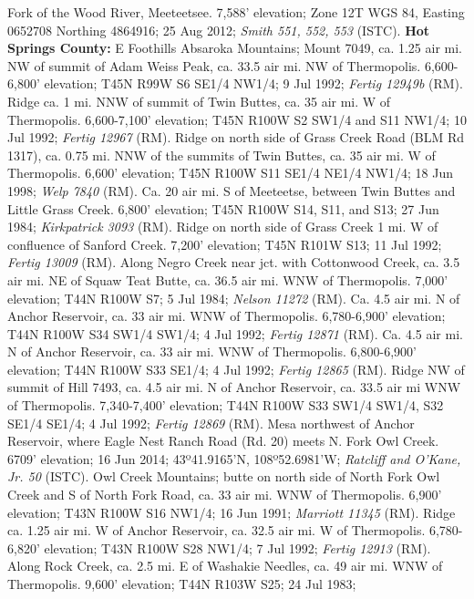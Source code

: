 Fork of the Wood River, Meeteetsee. 7,588’ elevation; Zone 12T WGS 84,
Easting 0652708 Northing 4864916; 25 Aug 2012; 
\textit{Smith 551, 552, 553} (ISTC).
  \textbf{Hot Springs County:}
E Foothills Absaroka Mountains; Mount 7049, ca. 1.25 air mi. NW of summit of
Adam Weiss Peak, ca. 33.5 air mi. NW of Thermopolis. 6,600-6,800' elevation;
T45N R99W S6 SE1/4 NW1/4; 9 Jul 1992; \textit{Fertig 12949b} (RM).
Ridge ca. 1 mi. NNW of summit of Twin Buttes, ca. 35 air mi. W of Thermopolis.
6,600-7,100' elevation; T45N R100W S2 SW1/4 and S11 NW1/4; 10 Jul 1992;
\textit{Fertig 12967} (RM).
Ridge on north side of Grass Creek Road (BLM Rd 1317), ca. 0.75 mi. NNW of the
summits of Twin Buttes, ca. 35 air mi. W of Thermopolis. 6,600' elevation;
T45N R100W S11 SE1/4 NE1/4 NW1/4; 18 Jun 1998; \textit{Welp 7840} (RM).
Ca. 20 air mi. S of Meeteetse, between Twin Buttes and Little Grass Creek.
6,800' elevation; T45N R100W S14, S11, and S13; 27 Jun 1984;
\textit{Kirkpatrick 3093} (RM).
Ridge on north side of Grass Creek 1 mi. W of confluence of Sanford Creek.
7,200' elevation; T45N R101W S13; 11 Jul 1992; \textit{Fertig 13009} (RM).
Along Negro Creek near jct. with Cottonwood Creek, ca. 3.5 air mi. NE of Squaw
Teat Butte, ca. 36.5 air mi. WNW of Thermopolis. 7,000' elevation;
T44N R100W S7; 5 Jul 1984; \textit{Nelson 11272} (RM).
Ca. 4.5 air mi. N of Anchor Reservoir, ca. 33 air mi. WNW of Thermopolis.
6,780-6,900' elevation; T44N R100W S34 SW1/4 SW1/4; 4 Jul 1992;
\textit{Fertig 12871} (RM).
Ca. 4.5 air mi. N of Anchor Reservoir, ca. 33 air mi. WNW of Thermopolis.
6,800-6,900' elevation; T44N R100W S33 SE1/4; 4 Jul 1992;
\textit{Fertig 12865} (RM).
Ridge NW of summit of Hill 7493, ca. 4.5 air mi. N of Anchor Reservoir, ca.
33.5 air mi WNW of Thermopolis. 7,340-7,400' elevation; T44N R100W S33 SW1/4
SW1/4, S32 SE1/4 SE1/4; 4 Jul 1992; \textit{Fertig 12869} (RM).
Mesa northwest of Anchor Reservoir, where Eagle Nest Ranch Road (Rd. 20) meets
N. Fork Owl Creek. 6709' elevation; 16 Jun 2014; 43º41.9165'N, 108º52.6981'W;
\textit{Ratcliff and O'Kane, Jr. 50} (ISTC).
Owl Creek Mountains; butte on north side of North Fork Owl Creek and S of
North Fork Road, ca. 33 air mi. WNW of Thermopolis. 6,900' elevation;
T43N R100W S16 NW1/4; 16 Jun 1991; \textit{Marriott 11345} (RM).
Ridge ca. 1.25 air mi. W of Anchor Reservoir, ca. 32.5 air mi. W of Thermopolis.
6,780-6,820' elevation; T43N R100W S28 NW1/4; 7 Jul 1992;
\textit{Fertig 12913} (RM).
Along Rock Creek, ca. 2.5 mi. E of Washakie Needles, ca. 49 air mi. WNW of
Thermopolis. 9,600' elevation; T44N R103W S25; 24 Jul 1983;
